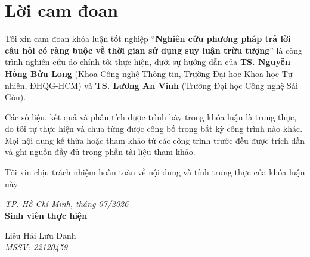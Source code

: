 \chapter*{Lời cam đoan}
\label{commitment}

Tôi xin cam đoan khóa luận tốt nghiệp ``\textbf{Nghiên cứu phương pháp trả lời câu hỏi có ràng
buộc về thời gian sử dụng suy luận trừu tượng}'' là công trình nghiên cứu do chính tôi thực hiện,
dưới sự hướng dẫn của \textbf{TS. Nguyễn Hồng Bửu Long} (Khoa Công nghệ Thông tin, Trường Đại học
Khoa học Tự nhiên, ĐHQG-HCM) và \textbf{TS. Lương An Vinh} (Trường Đại học Công nghệ Sài Gòn).

Các số liệu, kết quả và phân tích được trình bày trong khóa luận là trung thực, do tôi tự thực
hiện và chưa từng được công bố trong bất kỳ công trình nào khác. Mọi nội dung kế thừa hoặc tham
khảo từ các công trình trước đều được trích dẫn và ghi nguồn đầy đủ trong phần tài liệu tham khảo.

Tôi xin chịu trách nhiệm hoàn toàn về nội dung và tính trung thực của khóa luận này.

\vspace{1.5cm}

\begin{center}
\textit{TP. Hồ Chí Minh, tháng 07/2026}\\[0.3cm]
\textbf{Sinh viên thực hiện}
\end{center}

\vspace{2cm}

\begin{center}
Liêu Hải Lưu Danh\\
\textit{MSSV: 22120459}
\end{center}
